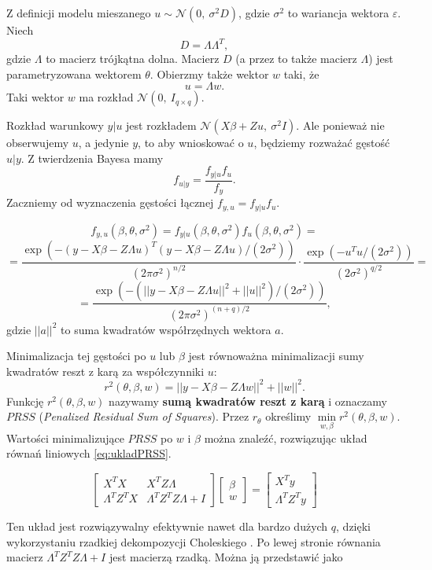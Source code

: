 \documentclass[12pt]{mwbk}
\theoremstyle{plain}
\theoremstyle{definition}
\theoremstyle{definition}
\begin{document}
Z definicji modelu mieszanego $u \sim \mathcal{N}(0,~\sigma^2D)$, gdzie $\sigma^2$ to wariancja wektora $\varepsilon$. Niech $$D=\Lambda \Lambda^T,$$ gdzie $\Lambda$ to macierz trójkątna dolna. Macierz $D$ (a przez to także macierz $\Lambda$) jest parametryzowana wektorem $\theta$. Obierzmy także wektor $w$ taki, że $$u=\Lambda w.$$ Taki wektor $w$ ma rozkład $\mathcal{N}(0,~I_{q \times q})$.



Rozkład warunkowy $y|u$ jest rozkładem $\mathcal{N}(X\beta+Zu,~\sigma^2I)$. Ale ponieważ nie obserwujemy $u$, a jedynie $y$, to aby wnioskować o $u$, będziemy rozważać gęstość $u|y$. Z twierdzenia Bayesa \cite{bayes} mamy $$f_{u|y}=\frac{f_{y|u}f_u}{f_y}.$$ Zaczniemy od wyznaczenia gęstości łącznej $f_{y,u}=f_{y|u}f_u$.

$$f_{y,u}(\beta, \theta, \sigma^2)=f_{y|u}(\beta, \theta, \sigma^2)f_u(\beta, \theta, \sigma^2)=$$
$$=\frac{\exp(-(y-X\beta -Z \Lambda u)^T(y-X\beta-Z\Lambda u)/(2\sigma^2))}{(2\pi \sigma^2)^{n/2}}\cdot \frac{\exp(-u^Tu/(2\sigma^2))}{(2\sigma^2)^{q/2}}=$$
$$=\frac{\exp(-(||y-X\beta-Z\Lambda u||^2+||u||^2)/(2\sigma^2))}{(2\pi \sigma^2)^{(n+q)/2}},$$ gdzie $||a||^2$ to suma kwadratów współrzędnych wektora $a$.

Minimalizacja tej gęstości po $u$ lub $\beta$ jest równoważna minimalizacji sumy kwadratów reszt z karą za współczynniki $u$:
$$r^2(\theta, \beta, w)=||y-X\beta-Z\Lambda w||^2+||w||^2.$$ Funkcję $r^2(\theta, \beta, w)$ nazywamy \textbf{sumą kwadratów reszt z karą} i oznaczamy $PRSS$ (\textit{Penalized Residual Sum of Squares}). Przez $r_{\theta}$ określimy $\min\limits_{w,\beta} r^2(\theta, \beta,w)$. Wartości minimalizujące $PRSS$ po $w$ i $\beta$ można znaleźć, rozwiązując układ równań liniowych \ref{eq:ukladPRSS}.

\begin{equation} \label{eq:ukladPRSS}
\begin{bmatrix}
X^TX & X^TZ\Lambda \\
\Lambda^TZ^TX & \Lambda^TZ^TZ\Lambda +I
\end{bmatrix}
\begin{bmatrix}
\beta \\
w
\end{bmatrix}=
\begin{bmatrix}
X^Ty\\
\Lambda^TZ^Ty
\end{bmatrix}
\end{equation}

Ten układ jest rozwiązywalny efektywnie nawet dla bardzo dużych $q$, dzięki wykorzystaniu rzadkiej dekompozycji Choleskiego \cite{cholesky}. Po lewej stronie równania macierz $\Lambda^TZ^TZ\Lambda+I$ jest macierzą rzadką. Można ją przedstawić jako
\end{document}
